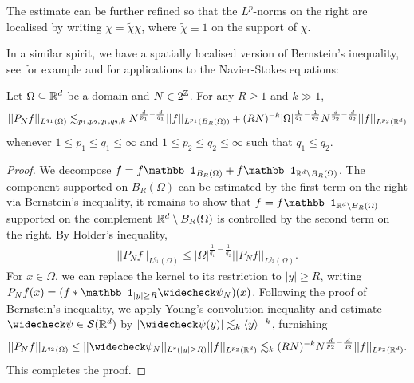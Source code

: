 \begin{remark}
	The estimate can be further refined so that the $L^p$-norms on the right are localised by writing $\chi = \widetilde \chi \chi$, where $\widetilde \chi \equiv 1$ on the support of $\chi$. 
\end{remark}

In a similar spirit, we have a spatially localised version of Bernstein's inequality, see for example \cite{Tao2020} and \cite{Palasek2022} for applications to the Navier-Stokes equations: 

\begin{proposition}
	Let $\Omega \subseteq \mathbb R^d$ be a domain and $N \in 2^\mathbb Z$. For any $R \geq 1$ and $k \gg 1$, 
		\[ || P_N f ||_{L^{q_1} (\Omega)} \lesssim_{p_1, p_2, q_1, q_2, k} N^{\frac{d}{p_1} - \frac{d}{q_1}} ||f||_{L^{p_1} (B_R (\Omega))} + (RN)^{-k} |\Omega|^{\frac{1}{q_1} - \frac{1}{q_2}} N^{\frac{d}{p_2} - \frac{d}{q_2}} ||f||_{L^{p_2} (\mathbb R^d)}  \]
	whenever $1 \leq p_1 \leq q_1 \leq \infty$ and $1 \leq p_2 \leq q_2 \leq \infty$ such that $q_1 \leq q_2$. 
\end{proposition}

\begin{proof}
	We decompose $f = f \mathbb 1_{B_R (\Omega)} + f \mathbb 1_{\R^d \setminus B_R (\Omega)}$. The component supported on $B_R (\Omega)$ can be estimated by the first term on the right via Bernstein's inequality, it remains to show that $f =  f \mathbb 1_{\R^d \setminus B_R (\Omega)}$ supported on the complement $\mathbb R^d \setminus B_R (\Omega)$ is controlled by the second term on the right. By Holder's inequality, 
		\begin{align*}
			|| P_N f ||_{L^{q_1} (\Omega)} \leq |\Omega|^{\frac{1}{q_1} - \frac{1}{q_2}} || P_N f||_{L^{q_2} (\Omega)}. 
		\end{align*}
	For $x \in \Omega$, we can replace the kernel to its restriction to $|y| \geq R$, writing $P_N f(x) = (f * \mathbb 1_{|y| \geq R}\widecheck \psi_N) (x)$. Following the proof of Bernstein's inequality, we apply Young's convolution inequality and estimate $\widecheck \psi \in \cS (\R^d)$ by $|\widecheck \psi (y)| \lesssim_k \langle y \rangle^{-k}$, furnishing
		\[ ||P_N f||_{L^{q_2} (\Omega)} \leq  ||\widecheck \psi_N||_{L^r (|y| \geq R)} ||f||_{L^{p_2} (\R^d)} \lesssim_k (RN)^{-k} N^{\frac{d}{p_2} - \frac{d}{q_2}} ||f||_{L^{p_2} (\R^d)}.  \]
	This completes the proof. 
\end{proof}

